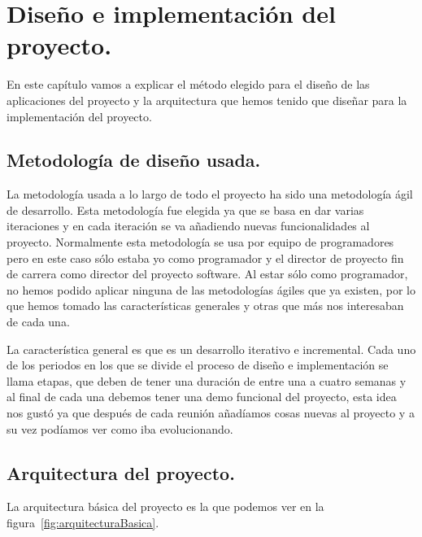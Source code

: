 \chapter{Diseño e implementación del proyecto.}\label{cap:DisenhoEImplementacion}
En este capítulo vamos a explicar el método elegido para el diseño de las aplicaciones del proyecto y la arquitectura que hemos tenido que diseñar para la implementación del proyecto.

\section{Metodología de diseño usada.}

La metodología usada a lo largo de todo el proyecto ha sido una metodología ágil de desarrollo. Esta metodología fue elegida ya que se basa en dar varias iteraciones y en cada iteración se va añadiendo nuevas funcionalidades al proyecto. Normalmente esta metodología se usa por equipo de programadores pero en este caso sólo estaba yo como programador y el director de proyecto fin de carrera como director del proyecto software. Al estar sólo como programador, no hemos podido aplicar ninguna de las metodologías ágiles que ya existen, por lo que hemos tomado las características generales y otras que más nos interesaban de cada una.

La característica general es que es un desarrollo iterativo e incremental. Cada uno de los periodos en los que se divide el proceso de diseño e implementación se llama etapas, que deben de tener una duración de entre una a cuatro semanas y al final de cada una debemos tener una demo funcional del proyecto, esta idea nos gustó ya que después de cada reunión añadíamos cosas nuevas al proyecto y a su vez podíamos ver como iba evolucionando.  

\section{Arquitectura del proyecto.}

La arquitectura básica del proyecto es la que podemos ver en la figura~\ref{fig:arquitecturaBasica}.

